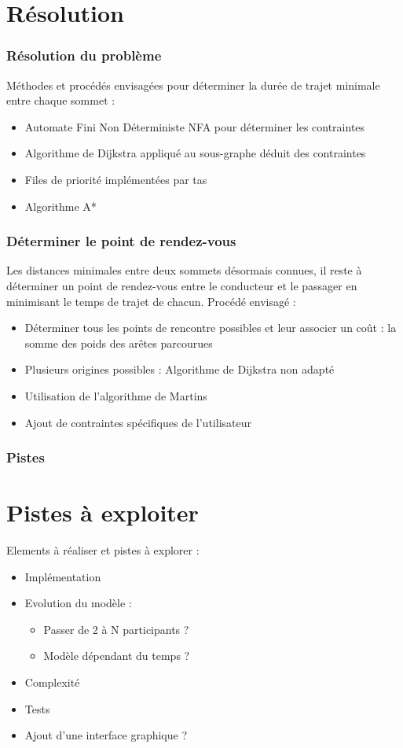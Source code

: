 \documentclass{beamer}
\begin{document}
\section{Résolution}

\begin{frame}
  \frametitle{Résolution du problème}

  Méthodes et procédés envisagées pour déterminer la durée de trajet minimale entre chaque sommet :

  \begin{itemize}
    \item Automate Fini Non Déterministe NFA pour déterminer les contraintes
    \item Algorithme de Dijkstra appliqué au sous-graphe déduit des contraintes
    \item Files de priorité implémentées par tas
    \item Algorithme A*
  \end{itemize}
\end{frame}

\begin{frame}
  \frametitle{Déterminer le point de rendez-vous}

  Les distances minimales entre deux sommets désormais connues, il reste à déterminer un point de rendez-vous entre le conducteur et le passager en minimisant le temps de trajet de chacun.
  \newline
  Procédé envisagé :
  \begin{itemize}
    \item Déterminer tous les points de rencontre possibles et leur associer un coût : la somme des poids des arêtes parcourues
    \item Plusieurs origines possibles : Algorithme de Dijkstra non adapté
    \item Utilisation de l'algorithme de Martins
    \item Ajout de contraintes spécifiques de l'utilisateur
  \end{itemize}
\end{frame}

\begin{frame}
  \frametitle{Pistes}

  \section{Pistes à exploiter}
  Elements à réaliser et pistes à explorer :
  \begin{itemize}
    \item Implémentation
    \item Evolution du modèle :
          \begin{itemize}
            \item Passer de 2 à N participants ?
            \item Modèle dépendant du temps ?
          \end{itemize}
    \item Complexité
    \item Tests
    \item Ajout d'une interface graphique ?
  \end{itemize}
\end{frame}
\end{document}
